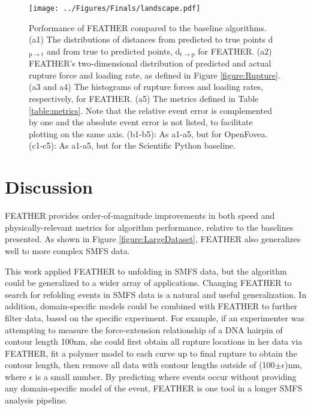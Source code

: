 \documentclass[%
  aip,12pt,tightenlines,
  amsthm,
 amsmath,amssymb
]{article}
\newcommand{\tRef}[1]{Table \ref{table:#1}}
\newcommand{\fRef}[1]{Figure \ref{figure:#1}}
\newcommand{\fLabel}[1]{\label{figure:#1}}
\newcommand{\sLabel}[1]{\label{section:#1}}
\newcommand{\firstp}[0]{}
\newcommand{\pl}[0]{\vspace{6pt}}
\newcommand{\pEndF}[0]{ \\ }
\newcommand{\pStartF}[0]{ }
\newcommand{\name}[0]{FEATHER}
\newcommand{\figwidth}[0]{\linewidth}
\newcommand{\singlemol}[0]{SMFS}
\begin{document}
\begin{figure}
\centering
\texttt{[image: ../Figures/Finals/landscape.pdf]}%
\caption[Algorithm Performance]{\noindent\fLabel{Performance}\pStartF Performance of \name{} compared to the baseline algorithms. (a1) The distributions of distances from predicted to true points d$_{\mathrm{p}\rightarrow\mathrm{t}}$ and from true to predicted points, d$_{\mathrm{t}\rightarrow\mathrm{p}}$ for \name{}. (a2) \name{}'s two-dimensional distribution of predicted and actual rupture force and loading rate, as defined in \fRef{Rupture}. (a3 and a4) The histograms of rupture forces and loading rates, respectively, for \name{}.  (a5) The metrics defined in \tRef{metrics}. Note that the relative event error is complemented by one and the absolute event error is not listed, to facilitate plotting on the same axis. (b1-b5): As a1-a5, but for OpenFovea. (c1-c5): As a1-a5, but for the Scientific Python baseline. \pEndF }
\end{figure}



\section{\sLabel{Discussion}Discussion}


\firstp \pl \name{} provides order-of-magnitude improvements in both speed and physically-relevant metrics for algorithm performance, relative to the baselines presented. As shown in \fRef{LargeDataset}, \name{} also generalizes well to more complex \singlemol{} data.  \pl

This work applied \name{} to unfolding in \singlemol{} data, but the algorithm could be generalized to a wider array of applications. Changing \name{} to search for refolding events in \singlemol{} data is a natural and useful generalization. In addition, domain-specific models could be combined with \name{} to further filter data, based on the specific experiment. For example, if an experimenter was attempting to measure the force-extension relationship of a DNA hairpin of contour length 100nm, she could first obtain all rupture locations in her data via \name{}, fit a polymer model to each curve up to final rupture to obtain the contour length, then remove all data with contour lengths outside of (100$\pm \epsilon$)nm, where $\epsilon$ is a small number. By predicting where events occur without providing any domain-specific model of the event, \name{} is one tool in a longer \singlemol{} analysis pipeline.
\end{document}
